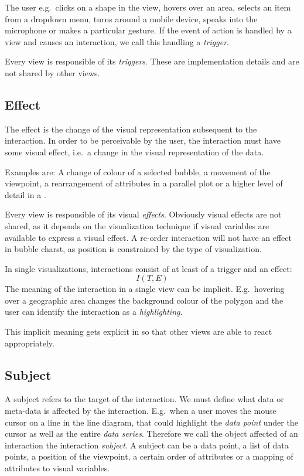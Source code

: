 The user e.g.\ clicks on a shape in the view, hovers over an area, selects an item from a dropdown menu, turns around a mobile device, speaks into the microphone or makes a particular gesture.
If the event of action is handled by a view and causes an interaction, we call this handling a \emph{trigger}.

Every view is responsible of its \emph{triggers}.
These are implementation details and are not shared by other views.

\subsection{Effect}
The effect is the change of the visual representation subsequent to the interaction.
In order to be perceivable by the user, the interaction must have some visual effect, i.e.\ a change in the visual representation of the data.

Examples are:
A change of colour of a selected bubble, a movement of the viewpoint, a rearrangement of attributes in a parallel plot or a higher level of detail in a \tmap{}.

Every view is responsible of its visual \emph{effects}.
Obviously visual effects are not shared, as it depends on the visualization technique if visual variables are available to express a visual effect.
A re-order interaction will not have an effect in bubble charst, as position is constrained by the type of visualization.

In single visualizations, interactions consist of at least of a trigger and an effect:
\begin{equation}
  I(T, E)
\end{equation}
The meaning of the interaction in a single view can be implicit.
E.g.\ hovering over a geographic area changes the background colour of the polygon and the user can identify the interaction as a \emph{highlighting}.

This implicit meaning gets explicit in \cmvs{} so that other views are able to react appropriately.


\subsection{Subject}
A subject refers to the target of the interaction.
We must define what data or meta-data is affected by the interaction.
E.g.\ when a user moves the mouse cursor on a line in the line diagram, that could highlight the \emph{data point} under the cursor as well as the entire \emph{data series}.
Therefore we call the object affected of an interaction the interaction \emph{subject}.
A subject can be a data point, a list of data points, a position of the viewpoint, a certain order of attributes or a mapping of attributes to visual variables.

